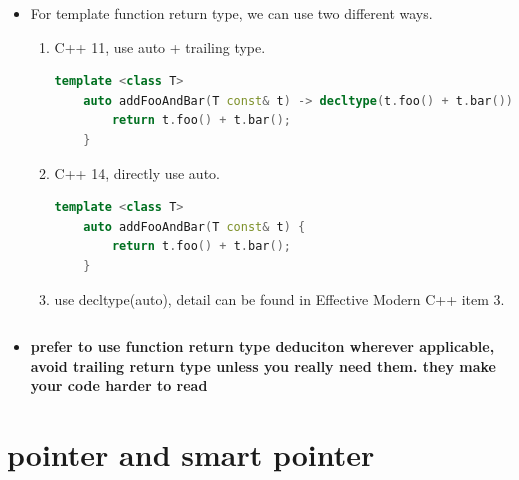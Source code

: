 \documentclass[a4paper,12pt,twoside]{book}
\begin{document}
\begin{itemize}
\item For template function return type, we can use two different ways.
\begin{enumerate}
	\item C++ 11, use auto + trailing type.
		\begin{lstlisting}[frame=single, language=c++]
	template <class T>
	auto addFooAndBar(T const& t) -> decltype(t.foo() + t.bar()) {
		return t.foo() + t.bar();
	}
		\end{lstlisting}
	\item C++ 14, directly use auto.
	\begin{lstlisting}[frame=single, language=c++]
	template <class T>
	auto addFooAndBar(T const& t) {
		return t.foo() + t.bar();
	}
	\end{lstlisting}
	\item use decltype(auto), detail can be found in Effective Modern C++ item 3.
	\begin{lstlisting}[frame=single, language=c++]

	\end{lstlisting}
\end{enumerate}
	
	\item \textbf{prefer to use function return type deduciton wherever applicable, avoid trailing return type unless you really need them. they make your code harder to read}
\end{itemize}


\chapter{pointer and smart pointer}
\end{document}
